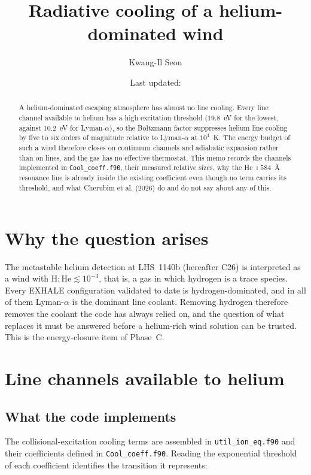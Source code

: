 \documentclass[english,a4paper]{my_memo}
\title{Radiative cooling of a helium-dominated wind}
\author{Kwang-Il Seon}
\date{Last updated: \docmoddate}
\begin{document}
\maketitle

\begin{abstract}
A helium-dominated escaping atmosphere has almost no line cooling. Every
line channel available to helium has a high excitation threshold
($19.8$~eV for the lowest, against $10.2$~eV for Lyman-$\alpha$), so the
Boltzmann factor suppresses helium line cooling by five to six orders of
magnitude relative to Lyman-$\alpha$ at $10^4$~K. The energy budget of such
a wind therefore closes on continuum channels and adiabatic expansion rather
than on lines, and the gas has no effective thermostat. This memo records
the channels implemented in \texttt{Cool\_coeff.f90}, their measured
relative sizes, why the He~\textsc{i} $584$~\AA{} resonance line is already
inside the existing coefficient even though no term carries its threshold, and
what Cherubim et al. (2026) do and do not say about any of this.
\end{abstract}

\section{Why the question arises}

The metastable helium detection at LHS~1140b \cite{Cherubim2026}
(hereafter C26) is interpreted as a wind with
$\mathrm{H\!:\!He} \lesssim 10^{-3}$, that is, a gas in which hydrogen is a
trace species. Every EXHALE configuration validated to date is
hydrogen-dominated, and in all of them Lyman-$\alpha$ is the dominant line
coolant. Removing hydrogen therefore removes the coolant the code has always
relied on, and the question of what replaces it must be answered before a
helium-rich wind solution can be trusted. This is the energy-closure item of Phase~C.

\section{Line channels available to helium}

\subsection{What the code implements}

The collisional-excitation cooling terms are assembled in
\texttt{util\_ion\_eq.f90} and their coefficients defined in
\texttt{Cool\_coeff.f90}. Reading the exponential threshold of each
coefficient identifies the transition it represents:
\end{document}
